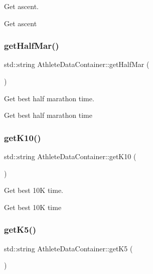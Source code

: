 Get ascent. 

Get ascent \mbox{\label{classAthleteDataContainer_afd68484bbb9ab67aadadcabccb39e498}} 
\subsubsection{\texorpdfstring{getHalfMar()}{getHalfMar()}}
{\footnotesize\ttfamily std\+::string Athlete\+Data\+Container\+::get\+Half\+Mar (\begin{DoxyParamCaption}{ }\end{DoxyParamCaption})}



Get best half marathon time. 

Get best half marathon time \mbox{\label{classAthleteDataContainer_a180284120d3d0a07963df6dfe031d099}} 
\subsubsection{\texorpdfstring{getK10()}{getK10()}}
{\footnotesize\ttfamily std\+::string Athlete\+Data\+Container\+::get\+K10 (\begin{DoxyParamCaption}{ }\end{DoxyParamCaption})}



Get best 10K time. 

Get best 10K time \mbox{\label{classAthleteDataContainer_a83c280c3f11eb819fe996fce9b36e52e}} 
\subsubsection{\texorpdfstring{getK5()}{getK5()}}
{\footnotesize\ttfamily std\+::string Athlete\+Data\+Container\+::get\+K5 (\begin{DoxyParamCaption}{ }\end{DoxyParamCaption})}




